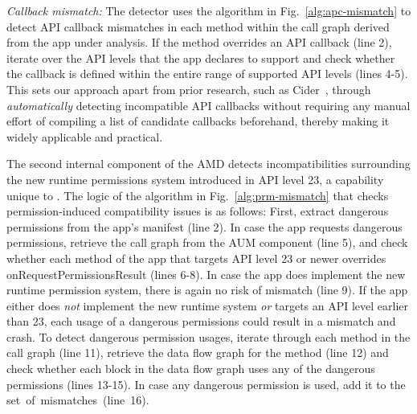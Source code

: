 \textit{Callback mismatch:} %
The detector uses the algorithm in Fig.~\ref{alg:apc-mismatch} to detect API callback mismatches in each method within the call graph derived from the app under analysis.
If the method overrides an API callback
(line 2), iterate over the API levels that the app declares to support and check whether the callback is defined within the entire range
of supported API levels (lines 4-5). This sets our approach apart from prior
research, such as {\sc Cider}~\cite{wu2017measuring}, through
\emph{automatically} detecting incompatible API callbacks without requiring any
manual effort of compiling a list of candidate callbacks beforehand, thereby
making it widely applicable and practical.





The second internal component of the AMD detects
incompatibilities surrounding the new runtime permissions system introduced in
API level 23, a capability unique to \@approach. %
The logic of the algorithm in Fig.~\ref{alg:prm-mismatch} that checks permission-induced compatibility issues is as follows:
First, extract dangerous permissions from the app's manifest (line 2).  
In case the app
requests dangerous permissions, retrieve the call graph from the AUM component (line 5), and check whether each method of the app that
targets API level 23 or newer overrides {\sf onRequestPermissionsResult} (lines
6-8). In case the app does implement the new runtime permission system, there
is again no risk of mismatch (line 9).  If the app either does \emph{not} implement
the new runtime system \emph{or} targets an API level earlier than
23, each usage of a dangerous permissions could result in a mismatch and crash.
To detect dangerous permission usages, iterate through each method in the call
graph (line 11), retrieve the data flow graph for the method (line 12) and check
whether each block in the data flow graph uses any of the dangerous permissions
(lines 13-15). In case any dangerous permission is used, add it to the
set~of~mismatches~(line~16).





